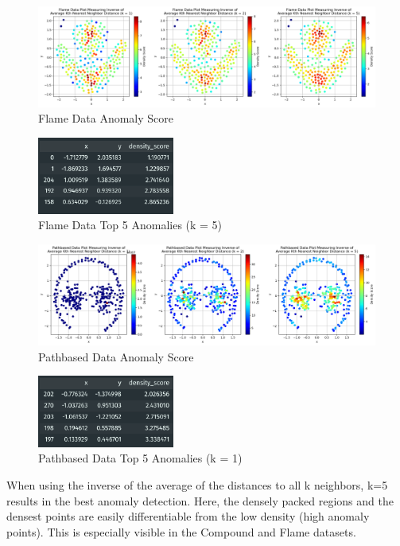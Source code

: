 \documentclass{article}
\begin{document}
\begin{figure}[H]
    \centering
    \includegraphics[width=\textwidth]{p3_p2b.png}
    \caption{Flame Data Anomaly Score}
\end{figure}
\begin{figure}[H]
    \centering
    \includegraphics[width=0.4\textwidth]{p3_d2b.png}
    \caption{Flame Data Top 5 Anomalies (k = 5)}
\end{figure}

\begin{figure}[H]
    \centering
    \includegraphics[width=\textwidth]{p3_p3b.png}
    \caption{Pathbased Data Anomaly Score}
\end{figure}
\begin{figure}[H]
    \centering
    \includegraphics[width=0.4\textwidth]{p3_d3b.png}
    \caption{Pathbased Data Top 5 Anomalies (k = 1)}
\end{figure}

When using the inverse of the average of the distances to all k neighbors, k=5 results in the
best anomaly detection. Here, the densely packed regions and the densest points are easily
differentiable from the low density (high anomaly points). This is especially visible
in the Compound and Flame datasets.
\end{document}

